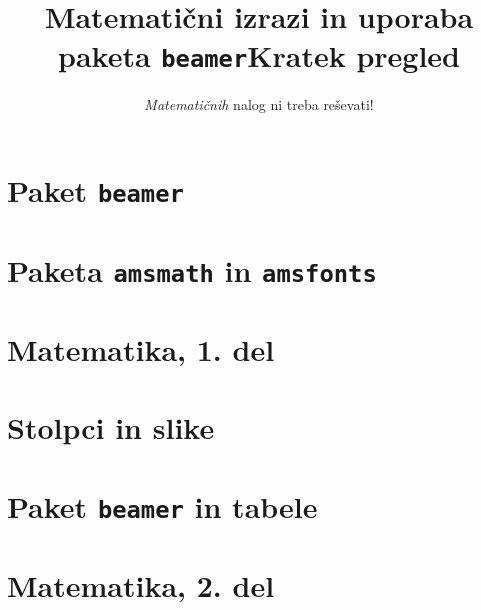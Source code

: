 \documentclass{beamer}
\begin{document}
{\theoremstyle{plain}
\newtheorem{izrek}{Izrek}[section]
\newtheorem{posledica}[izrek]{Posledica}
}
{\theoremstyle{definition}
\newtheorem{definicija}[izrek]{Definicija}
}
\title{Matematični izrazi in uporaba paketa \texttt{beamer}}
\subtitle{\emph{Matematičnih} nalog ni treba reševati!}
\date{}

\begin{frame}
    \titlepage
\end{frame}




\title{Kratek pregled}
\tableofcontents
\begin{frame}
    \titlepage
\end{frame}
\section{Paket \texttt{beamer}}

\section{Paketa \texttt{amsmath} in \texttt{amsfonts}}

\section[Matematika, 1. del\\\large{Analiza, logika, množice}]{Matematika, 1. del}

\section{Stolpci in slike}

\section{Paket \texttt{beamer} in tabele}

\section[Matematika, 2. del\\\large{Zaporedja, algebra, grupe}]{Matematika, 2. del}
\end{document}
